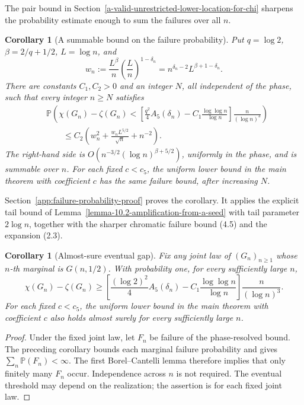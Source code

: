 \documentclass[a4paper,10pt,reqno]{amsart}
\numberwithin{equation}{section}
\theoremstyle{plain}
\newtheorem{corollary}[theorem]{Corollary}
\theoremstyle{remark}
\begin{document}
The pair bound in Section~\ref{a-valid-unrestricted-lower-location-for-chi}
sharpens the probability estimate enough to sum the failures over all \(n\).

\begin{corollary}[A summable bound on the failure probability]
\label{cor:phase-failure-probability}
Put \(q=\log2\), \(\beta=2/q+1/2\), \(L=\log n\), and
\[
 w_n:=\frac{L^\beta}{n}
       \left(\frac Ln\right)^{1-\delta_n}
     =n^{\delta_n-2}L^{\beta+1-\delta_n}.
\]
There are constants \(C_1,C_2>0\) and an integer \(N\), all independent of
the phase, such that every integer \(n\ge N\) satisfies
\[
 \begin{split}
 &\mathbb P\!\left(
  \chi(G_n)-\zeta(G_n)
  <\left[\frac{q^2}{4}A_5(\delta_n)
       -C_1\frac{\log\log n}{\log n}\right]\frac n{(\log n)^3}
 \right)
 \\[-2pt]
 &\qquad\le C_2\left(w_n^2+\frac{w_nL^{5/2}}{\sqrt n}+n^{-2}\right).
 \end{split}
\]
The right-hand side is \(O(n^{-3/2}(\log n)^{\beta+5/2})\), uniformly in
the phase, and is summable over \(n\). For each fixed \(c<c_5\), the
uniform lower bound in the main theorem with coefficient \(c\) has the same
failure bound, after increasing \(N\).
\end{corollary}

Section~\ref{app:failure-probability-proof} proves the corollary. It applies
the explicit tail bound of Lemma~\ref{lemma-10.2-amplification-from-a-seed}
with tail parameter $2\log n$, together with the sharper chromatic failure
bound (4.5) and the expansion (2.3).

\begin{corollary}[Almost-sure eventual gap]\label{cor:almost-sure-gap}
Fix any joint law of \((G_n)_{n\ge1}\) whose \(n\)-th marginal is
\(G(n,1/2)\). With probability one, for every sufficiently large \(n\),
\[
 \chi(G_n)-\zeta(G_n)
 \ge\left[\frac{(\log2)^2}{4}A_5(\delta_n)
       -C_1\frac{\log\log n}{\log n}\right]\frac n{(\log n)^3}.
\]
For each fixed \(c<c_5\), the uniform lower bound in the main theorem with
coefficient \(c\) also holds almost surely for every sufficiently large \(n\).
\end{corollary}
\begin{proof}
Under the fixed joint law, let \(F_n\) be failure of the phase-resolved bound.
The preceding corollary bounds each marginal failure probability and gives
\(\sum_n\mathbb P(F_n)<\infty\). The first Borel--Cantelli lemma therefore
implies that only finitely many \(F_n\) occur. Independence across \(n\) is
not required. The eventual threshold may depend on the realization; the
assertion is for each fixed joint law.
\end{proof}
\end{document}
